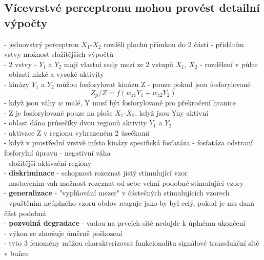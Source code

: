 \documentclass[11pt,a4paper]{report}
\begin{document}
\subsection{Vícevrstvé perceptronu mohou provést detailní výpočty}
- jednovstvý perceptron $X_1$-$X_2$ rozdělí plochu přímkou do 2 částí - přidáním vstvy možnost složitějších výpočtů\\
- 2 vstvy - $Y_1$ a $Y_2$ mají vlastní sady mezí ze 2 vstupů $X_1$, $X_2$ - rozdělení v půlce\\
\indent - oblasti nízké a vysoké aktivity\\
- kinázy $Y_1$ a $Y_2$ můžou fosforylovat kinázu Z - pouze pokud jsou fosforylované\\
\begin{equation}
Z_p/Z=f(w_{z1}Y_1+w_{z2}Y_2)
\end{equation}
- když jsou váhy $w$ malé, Y musí být fosforylované pro překročení hranice\\
\indent - Z je fosforylované pouze na ploše $X_1$-$X_2$, když jsou Yny aktivní\\
\indent - oblast dána průsečíky dvou regionů aktivity $Y_1$ a $Y_2$\\
\indent \indent - aktivace Z v regionu vyhrazeném 2 úsečkami\\
- když v prostřední vrstvě místo kinázy specifická fosfatáza - fosfatáza odstraní fosforylní úpravu - negativní váha\\
\indent - složitější aktivační regiony\\
- \textbf{diskriminace} - schopnost rozeznat jistý stimulující vzor\\
\indent - nastavením vah možnost rozeznat od sebe velmi podobné stimulující vzory\\
- \textbf{generalizace} - "vyplňování mezer" v částečných stimulujících vzorech\\
\indent - vpuštěním neúplného vzoru obdov reaguje jako by byl celý, pokud je mu daná část podobná\\
- \textbf{pozvolná degradace} - vadou na prvcích sítě nedojde k úplnému ukončení\\
\indent - výkon se zhoršuje úměrně poškození\\
- tyto 3 fenomény můžou charakterizovat funkcionalitu signálové transdukční sítě v buňce\\
\end{document}
